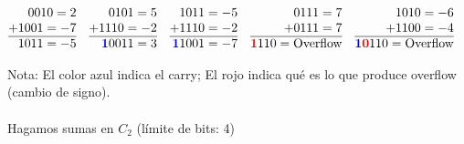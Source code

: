 \documentclass[10pt,a4paper]{article}
\begin{document}
\begin{align*}
    &\begin{array}{@{} r@{}}
      0010 = 2 \\
    + 1001 = -7\\
    \hline
    \ 1011 = -5
    \end{array}
    &&
    \begin{array}{@{} r @{}}
       0101 = 5 \\
    + 1110 = -2 \\
    \hline
    \textcolor{blue}{\textbf{1}}0011 = 3
    \end{array}
    &&
    \begin{array}{@{} r @{}}
       1011 = -5 \\
    + 1110 = -2 \\
    \hline
    \textcolor{blue}{\textbf{1}}1001 = -7
    \end{array}
    &&
    \begin{array}{@{} r @{}}
       0111 = 7 \\
    + 0111 = 7\\
    \hline
    \textcolor{red}{\textbf{1}}110 = \text{Overflow}
    \end{array}
    &&
    \begin{array}{@{} r @{}}
       1010 = -6 \\
    + 1100 = -4 \\
    \hline
    \textcolor{blue}{\textbf{1}}\textcolor{red}{\textbf{0}}110 = \text{Overflow}
    \end{array}
    \end{align*}

Nota: El color azul indica el carry; El rojo indica qué es lo que produce overflow (cambio de signo).
\\
\\
Hagamos sumas en \(C_{2}\) (límite de bits: 4)
\end{document}
